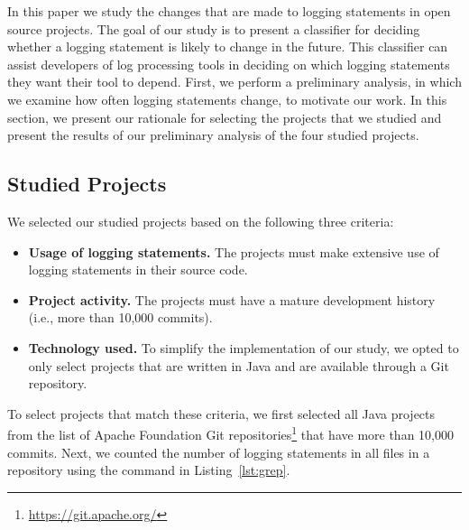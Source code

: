 In this paper we study the changes that are made to logging statements in open source projects. The goal of our study is to present a classifier for deciding whether a logging statement is likely to change in the future. This classifier can assist developers of log processing tools in deciding on which logging statements they want their tool to depend. %
First, we perform a preliminary analysis, in which we examine how often logging statements change, to motivate our work. In this section, we present our rationale for selecting the projects that we studied and present the results of our preliminary analysis of the four studied projects. 

\subsection{Studied Projects}
We selected our studied projects based on the following three criteria:
\begin{itemize}
	\item \textbf{Usage of logging statements.} The projects must make extensive use of logging statements in their source code.
	\item \textbf{Project activity.} The projects must have a mature development history (i.e., more than 10,000 commits).
	\item \textbf{Technology used.} To simplify the implementation of our study, we opted to only select projects that are written in Java and are available through a Git repository.
\end{itemize}

To select projects that match these criteria, we first selected all Java projects from the list of Apache Foundation Git repositories\footnote{\url{https://git.apache.org/}} that have more than 10,000 commits. Next, we counted the number of logging statements in all  files in a repository using the  command in Listing~\ref{lst:grep}.

